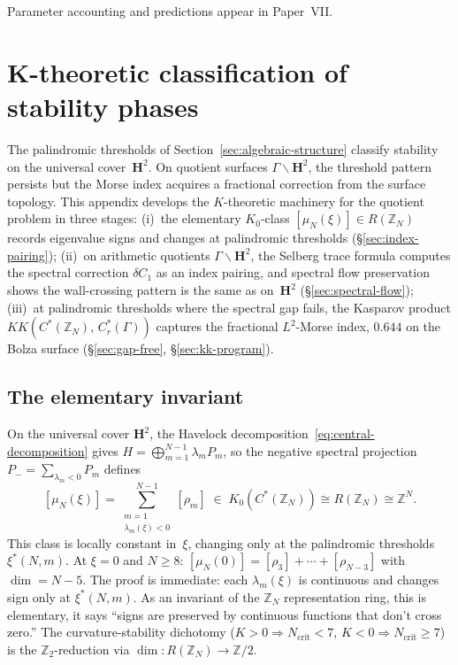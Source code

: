 Parameter accounting and predictions appear in Paper~VII.

\appendix
\section{K-theoretic classification of stability phases}
\label{sec:k-theory}

The palindromic thresholds of Section~\ref{sec:algebraic-structure}
classify stability on the universal cover~$\mathbf{H}^2$.
On quotient surfaces $\Gamma\backslash\mathbf{H}^2$, the threshold
pattern persists but the Morse index acquires a fractional correction
from the surface topology.
This appendix develops the $K$-theoretic machinery for the
quotient problem in three stages:
(i)~the elementary $K_0$-class
$[\mu_N(\xi)] \in R(\mathbb{Z}_N)$ records eigenvalue signs
and changes at palindromic thresholds (\S\ref{sec:index-pairing});
(ii)~on arithmetic quotients $\Gamma\backslash\mathbf{H}^2$,
the Selberg trace formula computes the spectral correction
$\delta C_1$ as an index pairing, and spectral flow preservation
shows the wall-crossing pattern is the same as
on~$\mathbf{H}^2$ (\S\ref{sec:spectral-flow});
(iii)~at palindromic thresholds where the spectral gap fails,
the Kasparov product
$KK(C^*(\mathbb{Z}_N),\,C^*_r(\Gamma))$ captures the
fractional $L^2$-Morse index, $0.644$ on the Bolza
surface (\S\ref{sec:gap-free}, \S\ref{sec:kk-program}).

\subsection{The elementary invariant}

On the universal cover $\mathbf{H}^2$, the Havelock
decomposition~\eqref{eq:central-decomposition} gives
$H = \bigoplus_{m=1}^{N-1} \lambda_m P_m$, so the negative
spectral projection $P_- = \sum_{\lambda_m < 0} P_m$ defines
\begin{equation}\label{eq:k0-class}
  [\mu_N(\xi)]
  = \sum_{\substack{m=1 \\ \lambda_m(\xi) < 0}}^{N-1} [\rho_m]
  \;\in\; K_0(C^*(\mathbb{Z}_N))
  \cong R(\mathbb{Z}_N)
  \cong \mathbb{Z}^N.
\end{equation}
This class is locally constant in~$\xi$, changing only at the
palindromic thresholds~$\xi^*(N,m)$.
At $\xi = 0$ and $N \ge 8$:
$[\mu_N(0)] = [\rho_3] + \cdots + [\rho_{N-3}]$
with $\dim = N{-}5$.
The proof is immediate:
each $\lambda_m(\xi)$ is continuous and changes sign only
at $\xi^*(N,m)$.
As an invariant of the $\mathbb{Z}_N$ representation ring,
this is elementary, it says ``signs are preserved by
continuous functions that don't cross zero.''
The curvature-stability dichotomy
($K > 0 \Rightarrow N_{\mathrm{crit}} < 7$,
$K < 0 \Rightarrow N_{\mathrm{crit}} \ge 7$)
is the $\mathbb{Z}_2$-reduction via
$\dim \colon R(\mathbb{Z}_N) \to \mathbb{Z}/2$.

